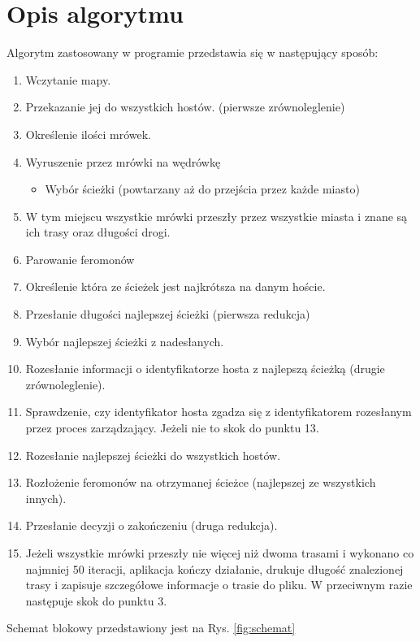\documentclass[12pt,a4paper]{article}
\begin{document}
\section{Opis algorytmu}
Algorytm zastosowany w programie przedstawia się w następujący sposób:
\begin{enumerate}
\item Wczytanie mapy.
\item Przekazanie jej do wszystkich hostów. (pierwsze zrównoleglenie)
\item Określenie ilości mrówek.
\item Wyruszenie przez mrówki na wędrówkę
\begin{itemize}
\item Wybór ścieżki (powtarzany aż do przejścia przez każde miasto)
\end{itemize}
\item W tym miejscu wszystkie mrówki przeszły przez wszystkie miasta i znane są ich trasy oraz długości drogi.
\item Parowanie feromonów
\item Określenie która ze ścieżek jest najkrótsza na danym hoście.
\item Przesłanie długości najlepszej ścieżki (pierwsza redukcja)
\item Wybór najlepszej ścieżki z nadesłanych.
\item Rozesłanie informacji o identyfikatorze hosta z najlepszą ścieżką (drugie zrównoleglenie).
\item Sprawdzenie, czy identyfikator hosta zgadza się z identyfikatorem rozesłanym przez proces zarządzający. Jeżeli nie to skok do punktu 13.
\item Rozesłanie najlepszej ścieżki do wszystkich hostów.
\item Rozłożenie feromonów na otrzymanej ścieżce (najlepszej ze wszystkich innych).
\item Przesłanie decyzji o zakończeniu (druga redukcja).
\item Jeżeli wszystkie mrówki przeszły nie więcej niż dwoma trasami i wykonano co najmniej 50 iteracji, aplikacja kończy działanie, drukuje długość znalezionej trasy i zapisuje szczegółowe informacje o trasie do pliku. W przeciwnym razie następuje skok do punktu 3.
\end{enumerate}
Schemat blokowy przedstawiony jest na Rys. \ref{fig:schemat}
\end{document}
